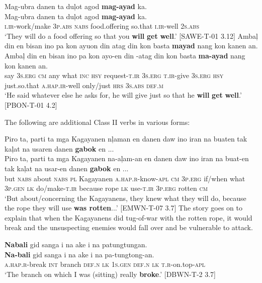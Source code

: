 \ea
\label{bkm:Ref148778256}
Mag-ubra  danen  ta  duļot  agod  \textbf{mag-ayad}  ka. \\\smallskip
\gll Mag-ubra  danen  ta  duļot  agod  \textbf{mag-ayad}  ka. \\
\textsc{i.ir}-work/make  3\textsc{p.abs}  \textsc{nabs}  food.offering  so.that  \textsc{i.ir}-well  2\textsc{s.abs} \\
\glt ‘They will do a food offering so that you \textbf{will} \textbf{get} \textbf{well}.’ [SAWE-T-01 3.12]
\z
\ea
\label{bkm:Ref148778286}
Ambaļ  din  en  bisan  ino  pa  kon  ayuon  din  atag  din kon  basta  \textbf{mayad}  nang  kon  kanen  an. \\\smallskip
\gll Ambaļ  din  en  bisan  ino  pa  kon  ayo-en  din  \emptyset{}-atag  din kon  basta  \textbf{ma-ayad}  nang  kon  kanen  an. \\
say  3\textsc{s.erg}  \textsc{cm}  any  what  \textsc{inc}  \textsc{hsy}  request-\textsc{t.ir}  3\textsc{s.erg}  \textsc{t.ir}-give  3\textsc{s.erg} \textsc{hsy}   just.so.that  \textsc{a.hap.ir}-well  only/just  \textsc{hrs}  3\textsc{s.abs}  \textsc{def.m} \\
\glt ‘He said whatever else he asks for, he will give just so that he \textbf{will} \textbf{get} \textbf{well}.’ [PBON-T-01 4.2] 
\z

The following are additional Class II verbs in various forms:

\ea
Piro  ta,  parti  ta  mga  Kagayanen  nļaman  en  danen  daw  ino  iran  na  buaten  tak  kaļat  na  usaren  danen   \textbf{gabok}  en ...\\\smallskip
\gll Piro  ta,  parti  ta  mga  Kagayanen  na-aļam-an  en  danen  daw  ino  iran  na  buat-en  tak  kaļat  na  usar-en  danen   \textbf{gabok}  en ...\\
but  \textsc{nabs}  about  \textsc{nabs}  \textsc{pl}  Kagayanen  \textsc{a.hap.r}-know-\textsc{apl}  \textsc{cm}  3\textsc{p.erg}  if/when
what  3\textsc{p.gen}  \textsc{lk}  do/make-\textsc{t.ir}  because  rope  \textsc{lk}  use-\textsc{t.ir}  3\textsc{p.erg}  rotten  \textsc{cm} \\
\glt  ‘But about/concerning the Kagayanens, they knew what they will do, because the rope they will use \textbf{was rotten}...’  [EMWN-T-07 3.7]
\z
The story goes on to explain that when the Kagayanens did tug-of-war with the rotten rope, it would break and the unsuspecting enemies would fall over and be vulnerable to attack.

\ea
\textbf{Nabali}  gid  sanga  i  na  ake  i  na  patungtungan. \\\smallskip
\gll \textbf{Na-bali}  gid  sanga  i  na  ake  i  na  pa-tungtong-an. \\
\textsc{a.}\textsc{hap.r}-break  \textsc{int}  branch  \textsc{def.n}  \textsc{lk}  1\textsc{s.gen}  \textsc{def.n}  \textsc{lk}  \textsc{t.r}-on.top-\textsc{apl} \\
\glt ‘The branch on which I was (sitting) really \textbf{broke}.’ [DBWN-T-2 3.7]
\z

